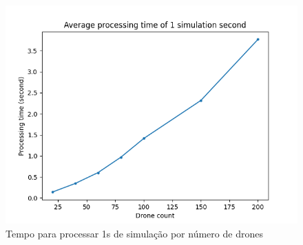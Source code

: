 \begin{figure}[ht]
    \centering
    \includegraphics[width=\textwidth]{img/time_process_1s_across_simulations.png}
    \caption{Tempo para processar 1s de simulação por número de drones}
    \label{fig:time_process_across}
\end{figure}


